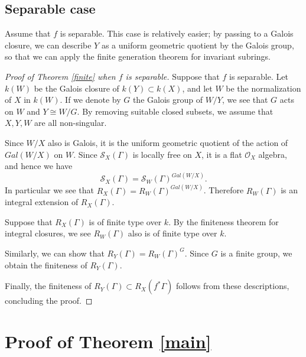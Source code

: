 \documentclass[12pt,twoside]{amsart}
\theoremstyle{definition}
\begin{document}
\subsection{Separable case}\label{Separable case}

Assume that $f$ is separable. This case is relatively easier; by
passing to a Galois closure, we can describe $Y$ as a uniform geometric
quotient by the Galois group, so that we can apply
the finite generation theorem for invariant subrings.

\begin{proof}[Proof of Theorem \ref{finite} when $f$ is separable]
Suppose that $f$ is separable.
Let $k(W)$ be the Galois closure of $k(Y)\subset k(X)$, and let $W$ be the
normalization of $X$ in $k(W)$. If we denote by $G$ the Galois group of $W/Y$,
we see that $G$ acts on $W$ and $Y\cong W/G$.
By removing suitable closed subsets, we assume that $X,Y,W$ are all non-singular.

Since $W/X$ also is Galois, it is the uniform geometric quotient of the action of $Gal{(W/X)}$
on $W$. Since $\mathcal{S}_X{(\Gamma)}$ is locally free on $X$, it is a flat $\mathcal{O}_X$
algebra, and hence we have
\begin{equation*}
\mathcal{S}_X{(\Gamma)}=\mathcal{S}_W{(\Gamma)}^{Gal(W/X)}.
\end{equation*}
In particular we see that
$R_X(\Gamma)=R_W(\Gamma)^{Gal(W/X)}$.
Therefore $R_W(\Gamma)$ is an integral extension of
$R_X(\Gamma)$.

Suppose that $R_X(\Gamma)$ is of finite type over $k$.
By the finiteness theorem for integral closures, we see
$R_W(\Gamma)$ also is of finite type over $k$.

Similarly, we can show that
$R_Y(\Gamma)=R_W(\Gamma)^{G}$.
Since $G$ is a finite group, we obtain the finiteness of $R_Y(\Gamma)$.

Finally, the finiteness of $R_Y(\Gamma)\subset R_X(f^{*}\Gamma)$ follows from these
descriptions, concluding the proof.
\end{proof}








\section{Proof of Theorem \ref{main}}\label{Proof of Theorem main}
\end{document}
